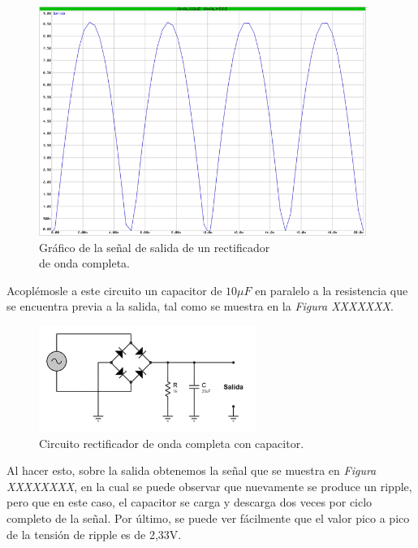 \documentclass{article}
\begin{document}
\newpage
\begin{figure}[h]
	\centering
	\includegraphics[width=0.95\textwidth]{images/4-4-6-grafico-circuito-rectificador-onda-completa.jpg}
	\medskip
	\caption{Gráfico de la señal de salida de un rectificador\\ de onda completa.}
\end{figure}
\bigskip\bigskip


	Acoplémosle a este circuito un capacitor de $10\mu F$ en paralelo a la resistencia que se encuentra previa a la salida, tal como se muestra en la \textit{Figura XXXXXXX}.
\bigskip


\begin{figure}[h]
	\centering
	\includegraphics[width=0.633\textwidth]{images/4-4-7-circuito-rectificador-onda-completa-con-filtro.jpg}
	\medskip
	\caption{Circuito rectificador de onda completa con capacitor.}
\end{figure}
\bigskip\bigskip


Al hacer esto, sobre la salida obtenemos la señal que se muestra en \textit{Figura XXXXXXXX}, en la cual se puede observar que nuevamente se produce un ripple, pero que en este caso, el capacitor se carga y descarga dos veces por ciclo completo de la señal. Por último, se puede ver fácilmente que el valor pico a pico de la tensión de ripple es de 2,33V.
\end{document}
